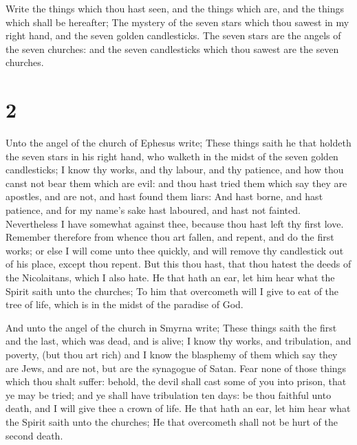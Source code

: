  Write the things which thou hast seen, and the things
which are, and the things which shall be hereafter;  The
mystery of the seven stars which thou sawest in my right hand, and the
seven golden candlesticks. The seven stars are the angels of the seven
churches: and the seven candlesticks which thou sawest are the seven
churches.

\hypertarget{section-1}{%
\section{2}\label{section-1}}

 Unto the angel of the church of Ephesus write; These things
saith he that holdeth the seven stars in his right hand, who walketh in
the midst of the seven golden candlesticks;  I know thy
works, and thy labour, and thy patience, and how thou canst not bear
them which are evil: and thou hast tried them which say they are
apostles, and are not, and hast found them liars:  And hast
borne, and hast patience, and for my name's sake hast laboured, and hast
not fainted.  Nevertheless I have somewhat against thee,
because thou hast left thy first love.  Remember therefore
from whence thou art fallen, and repent, and do the first works; or else
I will come unto thee quickly, and will remove thy candlestick out of
his place, except thou repent.  But this thou hast, that
thou hatest the deeds of the Nicolaitans, which I also hate.
 He that hath an ear, let him hear what the Spirit saith
unto the churches; To him that overcometh will I give to eat of the tree
of life, which is in the midst of the paradise of God.

 And unto the angel of the church in Smyrna write; These
things saith the first and the last, which was dead, and is alive;
 I know thy works, and tribulation, and poverty, (but thou
art rich) and I know the blasphemy of them which say they are Jews, and
are not, but are the synagogue of Satan.  Fear none of
those things which thou shalt suffer: behold, the devil shall cast some
of you into prison, that ye may be tried; and ye shall have tribulation
ten days: be thou faithful unto death, and I will give thee a crown of
life.  He that hath an ear, let him hear what the Spirit
saith unto the churches; He that overcometh shall not be hurt of the
second death.

